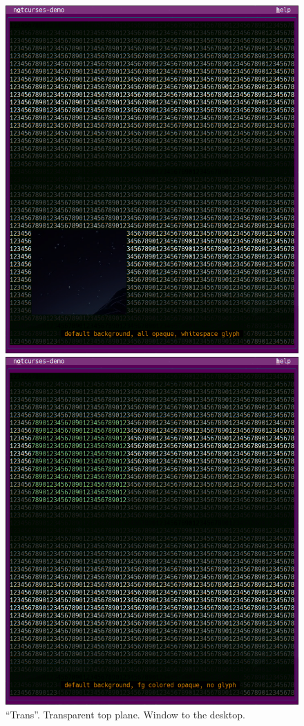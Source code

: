 \documentclass[letterpaper,10pt]{article}
\begin{document}
\begin{figure}
  \centering
  \begin{minipage}{0.30\textwidth}
    \includegraphics[width=1\linewidth]{media/demo-trans1.png}
    \caption[``Trans'', early phase.]{``Trans''. Transparent top plane. Window to the desktop.}
  \end{minipage}\hfill
  \begin{minipage}{0.30\textwidth}
    \includegraphics[width=1\linewidth]{media/demo-trans2.png}

\end{minipage}
\end{figure}
\end{document}
